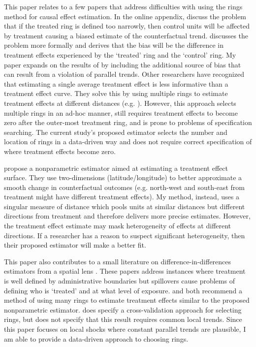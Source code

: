 \documentclass[10pt]{article}
\begin{document}
This paper relates to a few papers that address difficulties with using the rings method for causal effect estimation. In the online appendix, \citet{Gerardi_Rosenblatt_Willen_Yao_2015} discuss the problem that if the treated ring is defined too narrowly, then control units will be affected by treatment causing a biased estimate of the counterfactual trend. \citet{Sullivan_2017} discusses the problem more formally and derives that the bias will be the difference in treatment effects experienced by the `treated' ring and the `control' ring. My paper expands on the results of \citet{Sullivan_2017} by including the additional source of bias that can result from a violation of parallel trends. Other researchers have recognized that estimating a single average treatment effect is less informative than a treatment effect curve. They solve this by using multiple rings to estimate treatment effects at different distances (e.g. \citet{Alexander_Currie_Schnell_2019,Casey_Schiman_Wachala_2018,Di_Tella_Schargrodsky_2004}). However, this approach selects multiple rings in an ad-hoc manner, still requires treatment effects to become zero after the outer-most treatment ring, and is prone to problems of specification searching. The current study's proposed estimator selects the number and location of rings in a data-driven way and does not require correct specification of where treatment effects become zero.

\citet{Diamond_McQuade_2019} propose a nonparametric estimator aimed at estimating a treatment effect surface. They use two-dimensions (latitude/longitude) to better approximate a smooth change in counterfactual outcomes (e.g. north-west and south-east from treatment might have different treatment effects). My method, instead, uses a singular measure of distance which pools units at similar distances but different directions from treatment and therefore delivers more precise estimates. However, the treatment effect estimate may mask heterogeneity of effects at different directions. If a researcher has a reason to suspect significant heterogeneity, then their proposed estimator will make a better fit.

This paper also contributes to a small literature on difference-in-differences estimators from a spatial lens \citep{Butts_2021,Clarke_2017,Berg_Streitz_2019,Verbitsky-Savitz_Raudenbush_2012,Delgado_Florax_2015}. These papers address instances where treatment is well defined by administrative boundaries but spillovers cause problems of defining who is `treated' and at what level of exposure. \citet{Butts_2021} and \citet{Clarke_2017} both recommend a method of using many rings to estimate treatment effects similar to the proposed nonparametric estimator. \citet{Clarke_2017} does specify a cross-validation approach for selecting rings, but does not specify that this result requires common local trends. Since this paper focuses on local shocks where constant parallel trends are plausible, I am able to provide a data-driven approach to choosing rings.
\end{document}
